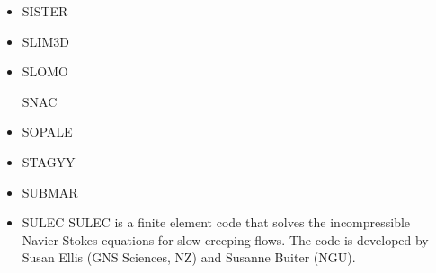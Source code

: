 \begin{itemize}
\item SISTER

\cite{olbm16}

\item SLIM3D

\cite{poso08}
\cite{qusp10}
\cite{brps12}
\cite{brps13}
\cite{brau13}
\cite{brun14}
\cite{hebr14}
\cite{kobf14}
\cite{clbq15}

\item SLOMO
\cite{kaus05}

\index SNAC
\cite{chlg08}


\item SOPALE

\cite{wibe94}
\cite{befh94}
\cite{full95}
\cite{elfb95}
\cite{bekh96}
\cite{will99a}
\cite{will99b}
\cite{pybf00}
\cite{bemh00}
\cite{bejn01}
\cite{hube02}
\cite{pybf02}
\cite{hube03}
\cite{vamf03}
\cite{wipo03}
\cite{pymi03}
\cite{bejn04}
\cite{pycr04}
\cite{pybe04}
\cite{elsp04}
\cite{geim04}
\cite{gebi05}
\cite{hubb05}
\cite{pysk06}
\cite{selz06}
\cite{hube07}
\cite{cubh07}
\cite{mohb07}
\cite{sebp08}
\cite{wabj08}
\cite{wabj08b}
\cite{kecw09}
\cite{bejb09}
\cite{bupb09}
\cite{grba09}
\cite{sihb09}
\cite{albs10}
\cite{albe10}
\cite{grpy10}
\cite{pygp10}
\cite{cube11}
\cite{bubj11}
\cite{hube11}
\cite{grpy12}
\cite{grpy12b}
\cite{kogp12}
\cite{grbe12}
\cite{jahu12}
\cite{bubj13}
\cite{chbe13}
\cite{fihv13a}
\cite{fihv13b}
\cite{gobi13}
\cite{grpy13}
\cite{knak13}
\cite{nipc13}
\cite{jahm13}
\cite{gogu14}
\cite{albe15}
\cite{bubj15}
\cite{heps15}
\cite{licu16}
\cite{bube17}


\item STAGYY
\cite{rota11}
\cite{yadl14}
\cite{crta14}
\cite{gult19}

\item SUBMAR
\cite{masr06}
\cite{masp07}
\cite{roms10}


\item SULEC
SULEC is a finite element code that solves the incompressible Navier-Stokes equations 
for slow creeping flows. The code is developed by Susan Ellis 
(GNS Sciences, NZ) and Susanne Buiter (NGU). 

\cite{qube11}
\cite{ellw11}
\cite{buit12}
\cite{tebu12} 
\cite{crsg12}
\cite{grel12}
\cite{ghbu13}
\cite{ghbu14}
\cite{qubu14}
\cite{nabu15}
\cite{zwsn16}
\cite{tebu17}











\end{itemize}
